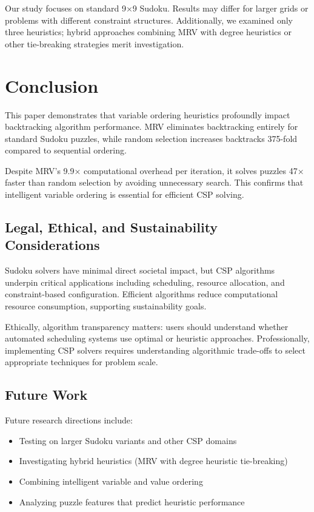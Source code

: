 \documentclass[conference]{IEEEtran}
\begin{document}
Our study focuses on standard 9×9 Sudoku. Results may differ for larger grids or problems with different constraint structures. Additionally, we examined only three heuristics; hybrid approaches combining MRV with degree heuristics or other tie-breaking strategies merit investigation.

\section{Conclusion}

This paper demonstrates that variable ordering heuristics profoundly impact backtracking algorithm performance. MRV eliminates backtracking entirely for standard Sudoku puzzles, while random selection increases backtracks 375-fold compared to sequential ordering.

Despite MRV's 9.9× computational overhead per iteration, it solves puzzles 47× faster than random selection by avoiding unnecessary search. This confirms that intelligent variable ordering is essential for efficient CSP solving.

\subsection{Legal, Ethical, and Sustainability Considerations}

Sudoku solvers have minimal direct societal impact, but CSP algorithms underpin critical applications including scheduling, resource allocation, and constraint-based configuration. Efficient algorithms reduce computational resource consumption, supporting sustainability goals.

Ethically, algorithm transparency matters: users should understand whether automated scheduling systems use optimal or heuristic approaches. Professionally, implementing CSP solvers requires understanding algorithmic trade-offs to select appropriate techniques for problem scale.

\subsection{Future Work}

Future research directions include:
\begin{itemize}
    \item Testing on larger Sudoku variants and other CSP domains
    \item Investigating hybrid heuristics (MRV with degree heuristic tie-breaking)
    \item Combining intelligent variable and value ordering
    \item Analyzing puzzle features that predict heuristic performance
\end{itemize}
\end{document}
